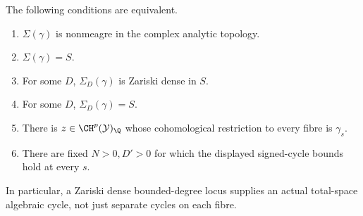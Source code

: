\begin{theorem}
\label{v7:new:thm:global}
The following conditions are equivalent.
\begin{enumerate}
\item \(\Sigma(\gamma)\) is nonmeagre in the complex analytic topology.
\item \(\Sigma(\gamma)=S\).
\item For some \(D\), \(\Sigma_D(\gamma)\) is Zariski dense in \(S\).
\item For some \(D\), \(\Sigma_D(\gamma)=S\).
\item There is \(z\in\CH^p(\mathcal Y)_\Q\) whose cohomological
restriction to every fibre is \(\gamma_s\).
\item There are fixed \(N>0,D'>0\) for which the displayed signed-cycle bounds hold at every \(s\).
\end{enumerate}
In particular, a Zariski dense bounded-degree locus supplies an
actual total-space algebraic cycle, not just separate cycles on
each fibre.
\end{theorem}

